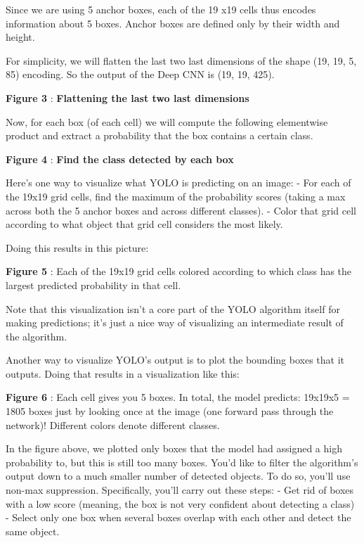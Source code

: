 \documentclass[11pt]{article}
\begin{document}
    Since we are using 5 anchor boxes, each of the 19 x19 cells thus encodes
information about 5 boxes. Anchor boxes are defined only by their width
and height.

For simplicity, we will flatten the last two last dimensions of the
shape (19, 19, 5, 85) encoding. So the output of the Deep CNN is (19,
19, 425).

 \textbf{Figure 3} : \textbf{Flattening the last two last dimensions}

    Now, for each box (of each cell) we will compute the following
elementwise product and extract a probability that the box contains a
certain class.

 \textbf{Figure 4} : \textbf{Find the class detected by each box}

Here's one way to visualize what YOLO is predicting on an image: - For
each of the 19x19 grid cells, find the maximum of the probability scores
(taking a max across both the 5 anchor boxes and across different
classes). - Color that grid cell according to what object that grid cell
considers the most likely.

Doing this results in this picture:

 \textbf{Figure 5} : Each of the 19x19 grid cells colored according to
which class has the largest predicted probability in that cell.

Note that this visualization isn't a core part of the YOLO algorithm
itself for making predictions; it's just a nice way of visualizing an
intermediate result of the algorithm.

    Another way to visualize YOLO's output is to plot the bounding boxes
that it outputs. Doing that results in a visualization like this:

 \textbf{Figure 6} : Each cell gives you 5 boxes. In total, the model
predicts: 19x19x5 = 1805 boxes just by looking once at the image (one
forward pass through the network)! Different colors denote different
classes.

In the figure above, we plotted only boxes that the model had assigned a
high probability to, but this is still too many boxes. You'd like to
filter the algorithm's output down to a much smaller number of detected
objects. To do so, you'll use non-max suppression. Specifically, you'll
carry out these steps: - Get rid of boxes with a low score (meaning, the
box is not very confident about detecting a class) - Select only one box
when several boxes overlap with each other and detect the same object.
\end{document}
